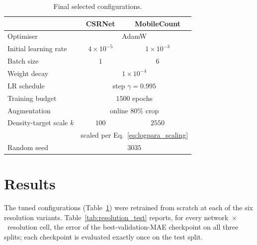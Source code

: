 \documentclass[conference]{IEEEtran}
\begin{document}
\begin{table}[h]
    \centering
    \caption{Final selected configurations.}
    \label{tab:final_configs}
    \begin{tabular}{lcc}
        \toprule
        & CSRNet & MobileCount \\
        \midrule
        Optimiser             & \multicolumn{2}{c}{AdamW} \\
        Initial learning rate & $4\times10^{-5}$ & $1\times10^{-3}$ \\
        Batch size            & $1$ & $6$ \\
        Weight decay          & \multicolumn{2}{c}{$1\times10^{-4}$} \\
        LR schedule           & \multicolumn{2}{c}{step $\gamma=0.995$} \\
        Training budget       & \multicolumn{2}{c}{$1500$ epochs} \\
        Augmentation          & \multicolumn{2}{c}{online $80\%$ crop} \\
        Density-target scale $k$ & $100$ & $2550$ \\
        & \multicolumn{2}{c}{\footnotesize scaled per Eq.~\eqref{eq:logpara_scaling}} \\
        Random seed           & \multicolumn{2}{c}{$3035$} \\
        \bottomrule
    \end{tabular}
\end{table}

\section{Results}\label{sec:results}
The tuned configurations (Table~\ref{tab:final_configs}) were retrained from
scratch at each of the six resolution variants. Table~\ref{tab:resolution_test}
reports, for every network~$\times$~resolution cell, the error of the
best-validation-MAE checkpoint on all three splits; each checkpoint is
evaluated exactly once on the test split.
\end{document}
